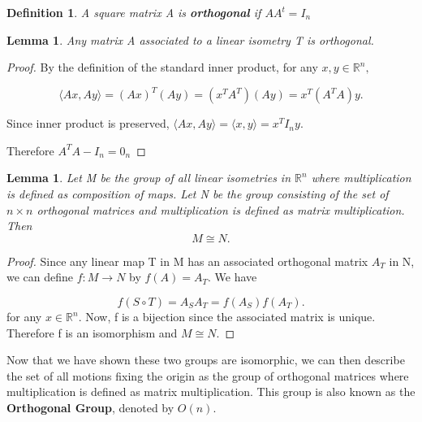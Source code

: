 \documentclass[a4 paper, 12pt]{article}
\newtheorem{lemma}[theorem]{Lemma}
\newtheorem{definition}[theorem]{Definition}
\begin{document}
	
	\begin{definition}
		A square matrix A is \textbf{orthogonal} if $AA^t = I_n$
	\end{definition}
	
	\begin{lemma}
		Any matrix A associated to a linear isometry T is orthogonal.
	\end{lemma}

	\begin{proof}
		By the definition of the standard inner product, for any $x,y \in \mathbb{R}^n,$
		
		$$\langle Ax , Ay \rangle = (Ax)^T(Ay) = (x^TA^T)(Ay) = x^T (A^TA)y.$$
		
		Since inner product is preserved, $\langle Ax, Ay \rangle = \langle x, y \rangle = x^TI_ny.$
		
		Therefore $A^TA -I_n = 0_n$
		 
	\end{proof}
	 
	 \begin{lemma}
	 	Let M be the group of all linear isometries in $\mathbb{R}^n$ where multiplication is defined as composition of maps. Let N be the group consisting of the set of $n \times n$ orthogonal matrices and multiplication is defined as matrix multiplication. Then $$M  \cong N.$$
	 \end{lemma}
	 
	 \begin{proof}
	 	Since any linear map T in M has an associated orthogonal matrix $A_T$ in N, we can define $f: M \rightarrow N$ by $f(A) = A_T.$ We have
	 	
	 	$$f(S\circ T)= A_{S}A_{T} = f(A_S)f(A_T).$$
	 	for any $x\in \mathbb{R}^n.$ Now, f is a bijection since the associated matrix is unique. Therefore f is an isomorphism and $M \cong N.$
	 
	 \end{proof}
	 Now that we have shown these two groups are isomorphic, we can then  describe the set of all motions fixing the origin as the group of orthogonal matrices where multiplication is defined as  matrix multiplication. This group is also known as the \textbf{Orthogonal Group}, denoted by $O(n).$
	 
\end{document}
